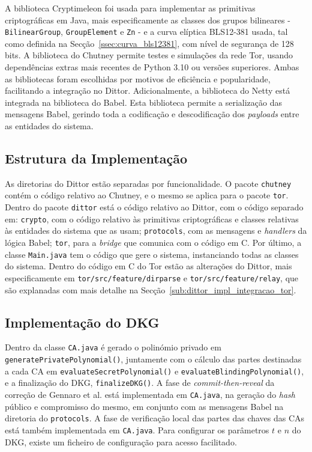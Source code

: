 A biblioteca Cryptimeleon foi usada para implementar as primitivas criptográficas em Java, mais especificamente as classes dos grupos bilineares - \texttt{BilinearGroup}, \texttt{GroupElement} e \texttt{Zn} - e a curva elíptica BLS12-381 usada, tal como definida na Secção~\ref{ssec:curva_bls12381}, com nível de segurança de 128 bits. A biblioteca do Chutney permite testes e simulações da rede Tor, usando dependências extras mais recentes de Python 3.10 ou versões superiores. Ambas as bibliotecas foram escolhidas por motivos de eficiência e popularidade, facilitando a integração no Dittor. Adicionalmente, a biblioteca do Netty está integrada na biblioteca do Babel. Esta biblioteca permite a serialização das mensagens Babel, gerindo toda a codificação e descodificação dos \textit{payloads} entre as entidades do sistema.

\subsection{Estrutura da Implementação}
\label{sub:dittor_impl_estrutura}

As diretorias do Dittor estão separadas por funcionalidade. O pacote \texttt{chutney} contém o código relativo ao Chutney, e o mesmo se aplica para o pacote \texttt{tor}. Dentro do pacote \texttt{dittor} está o código relativo ao Dittor, com o código separado em: \texttt{crypto}, com o código relativo às primitivas criptográficas e classes relativas às entidades do sistema que as usam; \texttt{protocols}, com as mensagens e \textit{handlers} da lógica Babel; \texttt{tor}, para a \textit{bridge} que comunica com o código em C. Por último, a classe \texttt{Main.java} tem o código que gere o sistema, instanciando todas as classes do sistema. Dentro do código em C do Tor estão as alterações do Dittor, mais especificamente em \texttt{tor/src/feature/dirparse} e \texttt{tor/src/feature/relay}, que são explanadas com mais detalhe na Secção~\ref{sub:dittor_impl_integracao_tor}.

\subsection{Implementação do DKG}
\label{sub:dittor_impl_dkg}

Dentro da classe \texttt{CA.java} é gerado o polinómio privado em \texttt{generatePrivatePolynomial()}, juntamente com o cálculo das partes destinadas a cada CA em \texttt{evaluateSecretPolynomial()} e \texttt{evaluateBlindingPolynomial()}, e a finalização do DKG, \texttt{finalizeDKG()}. A fase de \textit{commit-then-reveal} da correção de Gennaro et al. está implementada em \texttt{CA.java}, na geração do \textit{hash} público e compromisso do mesmo, em conjunto com as mensagens Babel na diretoria do \texttt{protocols}. A fase de verificação local das partes das chaves das CAs está também implementada em \texttt{CA.java}. Para configurar os parâmetros $t$ e $n$ do DKG, existe um ficheiro de configuração para acesso facilitado.

